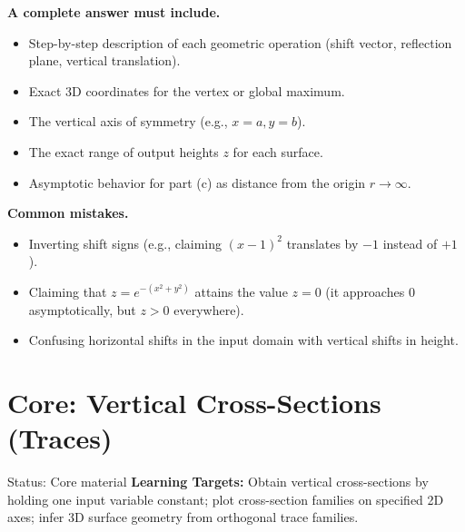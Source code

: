 \documentclass[11pt,letterpaper]{article}
\begin{document}
\textbf{A complete answer must include.}
\begin{itemize}[leftmargin=*,nosep]
    \item Step-by-step description of each geometric operation (shift vector, reflection plane, vertical translation).
    \item Exact 3D coordinates for the vertex or global maximum.
    \item The vertical axis of symmetry (e.g., $x=a, y=b$).
    \item The exact range of output heights $z$ for each surface.
    \item Asymptotic behavior for part (c) as distance from the origin $r \to \infty$.
\end{itemize}

\textbf{Common mistakes.}
\begin{itemize}[leftmargin=*,nosep]
    \item Inverting shift signs (e.g., claiming $(x-1)^2$ translates by $-1$ instead of $+1$).
    \item Claiming that $z = e^{-(x^2+y^2)}$ attains the value $z=0$ (it approaches $0$ asymptotically, but $z>0$ everywhere).
    \item Confusing horizontal shifts in the input domain with vertical shifts in height.
\end{itemize}

\clearpage

\section{Core: Vertical Cross-Sections (Traces)}\label{sec:cross-sections}
\begin{statusbox}{Status: Core material}
\textbf{Learning Targets:} Obtain vertical cross-sections by holding one input variable constant; plot cross-section families on specified 2D axes; infer 3D surface geometry from orthogonal trace families.
\end{statusbox}
\end{document}
